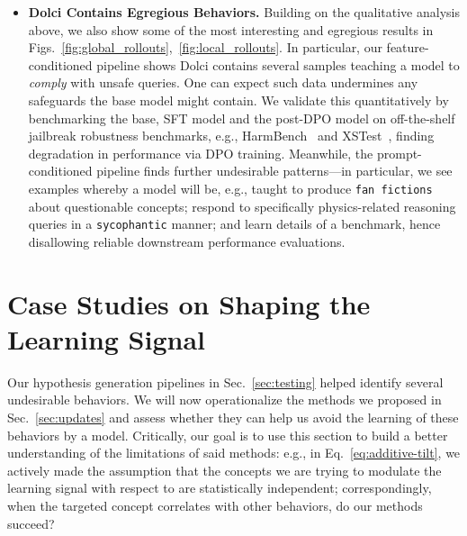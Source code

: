 \documentclass{article} %
\begin{document}
\begin{itemize}[leftmargin=*]
    

    \item \textbf{Dolci Contains Egregious Behaviors.} Building on the qualitative analysis above, we also show some of the most interesting and egregious results in Figs.~\ref{fig:global_rollouts},~\ref{fig:local_rollouts}.
    In particular, our feature-conditioned pipeline shows Dolci contains several samples teaching a model to \textit{comply} with unsafe queries.
    One can expect such data undermines any safeguards the base model might contain.
    We validate this quantitatively by benchmarking the base, SFT model and the post-DPO model on off-the-shelf jailbreak robustness benchmarks, e.g., HarmBench~\citep{mazeika2024harmbench} and XSTest~\citep{rottger2024xstest}, finding degradation in performance via DPO training.
    Meanwhile, the prompt-conditioned pipeline finds further undesirable patterns---in particular, we see examples whereby a model will be, e.g., taught to produce \texttt{fan fictions} about questionable concepts; respond to specifically physics-related reasoning queries in a \texttt{sycophantic} manner; and learn details of a benchmark, hence disallowing reliable downstream performance evaluations.
\end{itemize}
























\section{Case Studies on Shaping the Learning Signal}
\label{sec:results}

Our hypothesis generation pipelines in Sec.~\ref{sec:testing} helped identify several undesirable behaviors.
% 
We will now operationalize the methods we proposed in Sec.~\ref{sec:updates} and assess whether they can help us avoid the learning of these behaviors by a model.
% 
Critically, our goal is to use this section to build a better understanding of the limitations of said methods: e.g., in Eq.~\ref{eq:additive-tilt}, we actively made the assumption that the concepts we are trying to modulate the learning signal with respect to are statistically independent; correspondingly, when the targeted concept correlates with other behaviors, do our methods succeed?
\end{document}
